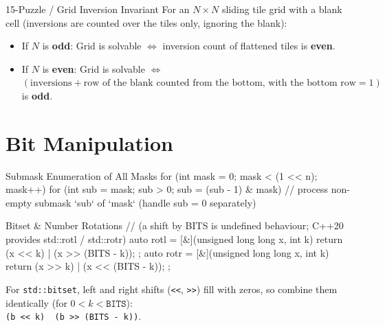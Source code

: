 \documentclass[10pt]{article}
\newcommand{\complexity}[1]{%
  \tcbox[on line,
    colback=tagbg,
    colframe=tagbg,
    boxrule=0pt,
    arc=2pt,
    boxsep=0pt,
    left=3.5pt, right=3.5pt, top=1.5pt, bottom=1.5pt
  ]{\color{tagtext}\scriptsize\bfseries\ensuremath{#1}}%
}
\begin{document}
\begin{conceptbox}{15-Puzzle / Grid Inversion Invariant}
    For an $N \times N$ sliding tile grid with a blank cell (inversions are counted over the tiles only, ignoring the blank):
    \begin{itemize}
        \item If $N$ is \textbf{odd}: Grid is solvable $\iff$ inversion count of flattened tiles is \textbf{even}.
        \item If $N$ is \textbf{even}: Grid is solvable $\iff$ $(\text{inversions} + \text{row of the blank counted from the bottom, with the bottom row} = 1)$ is \textbf{odd}.
    \end{itemize}
\end{conceptbox}

\newpage
\section{Bit Manipulation}

\begin{vscode}{Submask Enumeration of All Masks \complexity{O(3^N)}}
for (int mask = 0; mask < (1 << n); mask++) 
{
    for (int sub = mask; sub > 0; sub = (sub - 1) & mask)
    { // process non-empty submask `sub` of `mask` (handle sub = 0 separately) }
}
\end{vscode}

\begin{vscode}{Bitset \& Number Rotations \complexity{O(1)}}
// (a shift by BITS is undefined behaviour; C++20 provides std::rotl / std::rotr)
auto rotl = [&](unsigned long long x, int k) { return (x << k) | (x >> (BITS - k)); };
auto rotr = [&](unsigned long long x, int k) { return (x >> k) | (x << (BITS - k)); };
\end{vscode}
\begin{derivation}
    For \texttt{std::bitset}, left and right shifts (\texttt{<{}<}, \texttt{>{}>}) fill with zeros, so combine them identically (for $0 < k < \texttt{BITS}$): \\\texttt{(b <{}< k) \textbar\ (b >{}> (BITS - k))}.
\end{derivation}
\end{document}
